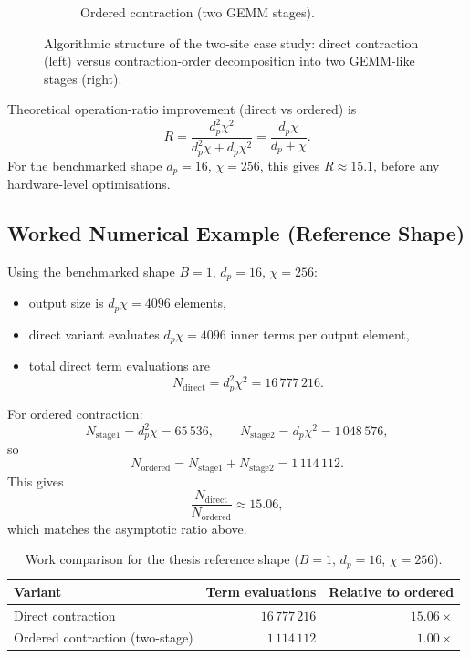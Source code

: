 \begin{figure}[H]
\begin{subfigure}[t]{0.48\textwidth}
    \caption{Ordered contraction (two GEMM stages).}
    \label{fig:tn-case-contraction-order-ordered}
  \end{subfigure}
  \caption{Algorithmic structure of the two-site case study: direct contraction
  (left) versus contraction-order decomposition into two GEMM-like stages
  (right).}
  \label{fig:tn-case-contraction-order-structure}
\end{figure}

Theoretical operation-ratio improvement (direct vs ordered) is
\[
  R
  =
  \frac{d_p^2\chi^2}{d_p^2\chi + d_p\chi^2}
  =
  \frac{d_p\chi}{d_p+\chi}.
\]
For the benchmarked shape $d_p=16$, $\chi=256$, this gives
$R\approx 15.1$, before any hardware-level optimisations.

\subsection{Worked Numerical Example (Reference Shape)}

Using the benchmarked shape $B=1$, $d_p=16$, $\chi=256$:
\begin{itemize}
  \item output size is $d_p\chi=4096$ elements,
  \item direct variant evaluates $d_p\chi=4096$ inner terms per output element,
  \item total direct term evaluations are
  \[
    N_{\text{direct}} = d_p^2\chi^2 = 16\,777\,216.
  \]
\end{itemize}

For ordered contraction:
\[
  N_{\text{stage1}} = d_p^2\chi = 65\,536,\qquad
  N_{\text{stage2}} = d_p\chi^2 = 1\,048\,576,
\]
so
\[
  N_{\text{ordered}} = N_{\text{stage1}}+N_{\text{stage2}} = 1\,114\,112.
\]
This gives
\[
  \frac{N_{\text{direct}}}{N_{\text{ordered}}}\approx 15.06,
\]
which matches the asymptotic ratio above.

\begin{table}[H]
  \centering
  \small
  \begin{tabularx}{\textwidth}{l r r}
    \toprule
    Variant & Term evaluations & Relative to ordered \\
    \midrule
    Direct contraction & $16\,777\,216$ & $15.06\times$ \\
    Ordered contraction (two-stage) & $1\,114\,112$ & $1.00\times$ \\
    \bottomrule
  \end{tabularx}
  \caption{Work comparison for the thesis reference shape ($B=1$, $d_p=16$,
  $\chi=256$).}
  \label{tab:tn-case-worked-example}
\end{table}

